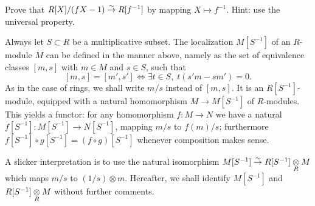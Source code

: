 \begin{exercise}
	Prove that $R[X]/(fX-1) \stackrel{\sim}{\rightarrow} R[f^{-1}]$ by mapping $X \mapsto f^{-1}$. Hint: use the universal property.
\end{exercise}

Always let $S \subset R$ be a multiplicative subset. The localization $M[S^{-1}]$ of an $R$-module $M$ can be defined in the manner above, namely as the set of equivalence classes $[m,s]$ with $m \in M$ and $s \in S$, such that
\[ [m,s] = [m',s'] \iff \exists t \in S, \; t(s'm - sm')=0. \]
As in the case of rings, we shall write $m/s$ instead of $[m,s]$. It is an $R[S^{-1}]$-module, equipped with a natural homomorphism $M \to M[S^{-1}]$ of $R$-modules. This yields a functor: for any homomorphism $f: M \to N$ we have a natural $f[S^{-1}]: M[S^{-1}] \to N[S^{-1}]$, mapping $m/s$ to $f(m)/s$; furthermore $f[S^{-1}] \circ g[S^{-1}] = (f \circ g)[S^{-1}]$ whenever composition makes sense.

A slicker interpretation is to use the natural isomorphism $M[S^{-1}] \stackrel{\sim}{\rightarrow} R[S^{-1}] \underset{R}{\otimes} M$ which maps $m/s$ to $(1/s) \otimes m$. Hereafter, we shall identify $M[S^{-1}]$ and $R[S^{-1}] \underset{R}{\otimes} M$ without further comments.

